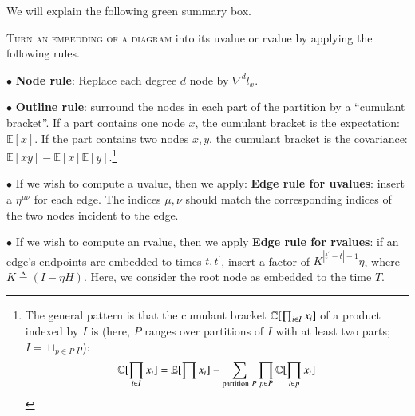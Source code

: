 \documentclass[anon,12pt]{colt2021} %
\newcommand{\wabs}[1]{\left|#1\right|}
\newcommand{\expc}{\mathbb{E}}
\begin{document}
        We will explain the following green summary box.
        \par
        \noindent
        \colorbox{moolime}{\parbox{\textwidth}{
            \textsc{Turn an embedding of a diagram} into its uvalue or rvalue
            by applying the following rules. 
            \par \indent $\bullet$
                \textbf{Node rule}: Replace each degree $d$ node by $\nabla^d
                l_x$.
            \par \indent $\bullet$
                \textbf{Outline rule}: surround the nodes in each part of the
                partition by a ``cumulant bracket''.  If a part contains one
                node $x$, the cumulant bracket is the expectation: $\expc[x]$.
                If the part contains two nodes $x,y$, the cumulant bracket is
                the covariance: $\expc[xy]-\expc[x]\expc[y]$.\footnote{
                    The general pattern is that the cumulant bracket $\mathbb{C}[\prod_{i\in I} x_i]$
                    of a product indexed by $I$ is (here, $P$ ranges over partitions of $I$ with at least 
                    two parts; $I = \sqcup_{p\in P} p$):
                    $$
                        \CC[\prod_{i\in I} x_i] = \expc[\prod x_i] - \sum_{\text{partition}~P} \prod_{p\in P} \CC[\prod_{i\in p} x_i]
                    $$
                }
            \par \indent $\bullet$  If we wish to compute a uvalue, then we apply:
                \textbf{Edge rule for uvalues}: insert a $\eta^{\mu\nu}$ for each
                edge.  The indices $\mu, \nu$ should match the corresponding
                indices of the two nodes incident to the edge.
            \par \indent $\bullet$ If we wish to compute an rvalue, then we apply
                \textbf{Edge rule for rvalues}: if an edge's endpoints are embedded to times
                $t, t^\prime$, insert a factor of $K^{\wabs{t^\prime-t}-1} \eta$,
                where $K \triangleq (I-\eta H)$.  Here, we consider the root node
                as embedded to the time $T$.
        }}

        
\end{document}
